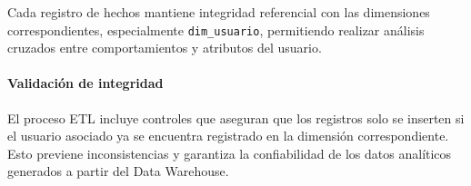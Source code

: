 Cada registro de hechos mantiene integridad referencial con las dimensiones correspondientes, especialmente \texttt{dim\_usuario}, permitiendo realizar análisis cruzados entre comportamientos y atributos del usuario.
\paragraph{Validación de integridad}
El proceso ETL incluye controles que aseguran que los registros solo se inserten si el usuario asociado ya se encuentra registrado en la dimensión correspondiente. Esto previene inconsistencias y garantiza la confiabilidad de los datos analíticos generados a partir del Data Warehouse.
